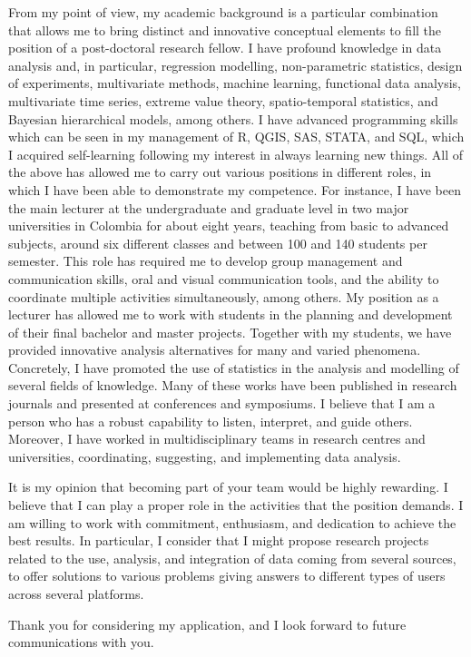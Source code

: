 \documentclass[11pt, a4paper]{awesome-cv}
\begin{document}
\begin{cvletter}
From my point of view, my academic background is a particular combination that allows me to bring distinct and innovative conceptual elements to fill the position of a post-doctoral research fellow. I have profound knowledge in data analysis and, in particular, regression modelling, non-parametric statistics, design of experiments, multivariate methods, machine learning, functional data analysis, multivariate time series, extreme value theory, spatio-temporal statistics, and Bayesian hierarchical models, among others. I have advanced programming skills which can be seen in my management of R, QGIS, SAS, STATA, and SQL, which I acquired self-learning following my interest in always learning new things. All of the above has allowed me to carry out various positions in different roles, in which I have been able to demonstrate my competence. For instance, I have been the main lecturer at the undergraduate and graduate level in two major universities in Colombia for about eight years, teaching from basic to advanced subjects, around six different classes and between 100 and 140 students per semester. This role has required me to develop group management and communication skills, oral and visual communication tools, and the ability to coordinate multiple activities simultaneously, among others. My position as a lecturer has allowed me to work with students in the planning and development of their final bachelor and master projects. Together with my students, we have provided innovative analysis alternatives for many and varied phenomena. Concretely, I have promoted the use of statistics in the analysis and modelling of several fields of knowledge. Many of these works have been published in research journals and presented at conferences and symposiums. I believe that I am a person who has a robust capability to listen, interpret, and guide others. Moreover, I have worked in multidisciplinary teams in research centres and universities, coordinating, suggesting, and implementing data analysis. \par
It is my opinion that becoming part of your team would be highly rewarding. I believe that I can play a proper role in the activities that the position demands. I am willing to work with commitment, enthusiasm, and dedication to achieve the best results. In particular, I consider that I might propose research projects related to the use, analysis, and integration of data coming from several sources, to offer solutions to various problems giving answers to different types of users across several platforms.\par\bigskip
Thank you for considering my application, and I look forward to future communications with you.
\end{cvletter}


\makeletterclosing
\end{document}
